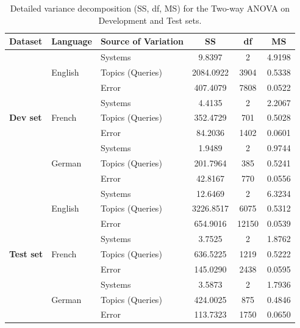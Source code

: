 \begin{table}[!ht]
\centering
\caption{Detailed variance decomposition (SS, df, MS) for the Two-way ANOVA on Development and Test sets.}
\label{tab:anova_variance_details}
\renewcommand{\arraystretch}{1.3}
\begin{tabular}{lllccc}
    \toprule
    \textbf{Dataset} & \textbf{Language} & \textbf{Source of Variation} & \textbf{SS} & \textbf{df} & \textbf{MS} \\
    \midrule
    \multirow{9}{*}{\textbf{Dev set}}
    & \multirow{3}{*}{English} & Systems          &    9.8397 &  2    &  4.9198 \\
    &                          & Topics (Queries) & 2084.0922 & 3904  &  0.5338 \\
    &                          & Error            &  407.4079 & 7808  &  0.0522 \\
    \cmidrule{2-6}
    & \multirow{3}{*}{French}  & Systems          &  4.4135   &  2    &  2.2067 \\
    &                          & Topics (Queries) & 352.4729  &  701  &  0.5028 \\
    &                          & Error            &  84.2036  & 1402  &  0.0601 \\
    \cmidrule{2-6}
    & \multirow{3}{*}{German}  & Systems          &  1.9489   &  2    &  0.9744 \\
    &                          & Topics (Queries) & 201.7964  &  385  &  0.5241 \\
    &                          & Error            &  42.8167  &  770  &  0.0556 \\
    \midrule
    \multirow{9}{*}{\textbf{Test set}}
    & \multirow{3}{*}{English} & Systems          & 12.6469   &  2    &  6.3234 \\
    &                          & Topics (Queries) & 3226.8517 & 6075  &  0.5312 \\
    &                          & Error            & 654.9016  & 12150 &  0.0539 \\
    \cmidrule{2-6}
    & \multirow{3}{*}{French}  & Systems          &  3.7525   &  2    &  1.8762 \\
    &                          & Topics (Queries) & 636.5225  & 1219  &  0.5222 \\
    &                          & Error            & 145.0290  & 2438  &  0.0595 \\
    \cmidrule{2-6}
    & \multirow{3}{*}{German}  & Systems          &  3.5873   &  2    &  1.7936 \\
    &                          & Topics (Queries) & 424.0025  &  875  &  0.4846 \\
    &                          & Error            & 113.7323  & 1750  &  0.0650 \\
    \bottomrule
\end{tabular}
\end{table}

